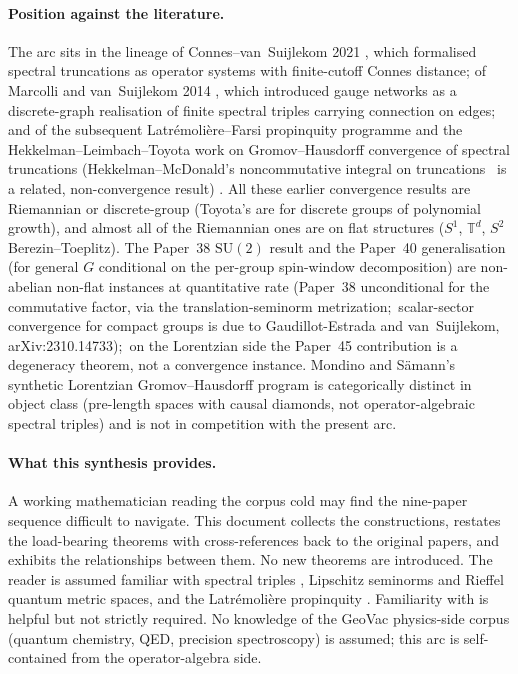 \documentclass[11pt,a4paper]{article}
\theoremstyle{plain}
\theoremstyle{definition}
\newcommand{\T}{\mathbb{T}}
\newcommand{\SU}{\mathrm{SU}}
\newcommand{\gvc}[2]{#2}
\begin{document}
\paragraph{Position against the literature.}
The arc sits in the lineage of Connes--van~Suijlekom 2021
\cite{connes_vs2021}, which formalised spectral truncations as
operator systems with finite-cutoff Connes distance; of Marcolli and
van~Suijlekom 2014 \cite{marcolli_vs2014}, which introduced
gauge networks as a discrete-graph realisation of finite spectral
triples carrying connection on edges; and of the subsequent
Latr\'emoli\`ere--Farsi propinquity programme and the
Hekkelman--Leimbach--Toyota work on Gromov--Hausdorff convergence of
spectral truncations
(Hekkelman--McDonald's noncommutative integral on
truncations~\cite{hekkelman_mcdonald2024b} is a related,
non-convergence result)
\cite{latremoliere_metric_st_2017,
hekkelman2022,
toyota2023,
farsi_latremoliere2024,farsi_latremoliere2025,
leimbach_vs2024}.  All these earlier convergence results
are Riemannian or discrete-group (Toyota's are for discrete groups of
polynomial growth), and almost all of the Riemannian ones are on flat
structures ($S^{1}$, $\T^{d}$, $S^{2}$ Berezin--Toeplitz).  The Paper~38
$\SU(2)$ result and \gvc{p40-general-g-conditional}{the Paper~40 generalisation (for general $G$
conditional on the per-group spin-window decomposition)} are non-abelian
non-flat instances at quantitative rate (\gvc{wh1-p38-gh-convergence}{Paper~38 unconditional for the commutative factor, via the translation-seminorm metrization};\ scalar-sector
convergence for compact groups is due to Gaudillot-Estrada and
van~Suijlekom, arXiv:2310.14733);\ on the Lorentzian side the
Paper~45 contribution is a degeneracy theorem, not a convergence
instance.  Mondino and S\"amann's
synthetic Lorentzian Gromov--Hausdorff program
\cite{minguzzi_suhr2024,mondino_samann2025} is categorically
distinct in object class (pre-length spaces with causal diamonds,
not operator-algebraic spectral triples) and is not in competition
with the present arc.

\paragraph{What this synthesis provides.}
A working mathematician reading the corpus cold may find the
nine-paper sequence difficult to navigate.  This document collects
the constructions, restates the load-bearing theorems with
cross-references back to the original papers, and exhibits the
relationships between them.  No new theorems are introduced.  The
reader is assumed familiar with spectral triples
\cite{connes1995,chamseddine_connes2010}, Lipschitz seminorms and
Rieffel quantum metric spaces, and the Latr\'emoli\`ere propinquity
\cite{latremoliere_metric_st_2017,latremoliere2018}.
Familiarity with \cite{connes_vs2021} is helpful but not strictly
required.  No knowledge of the GeoVac physics-side corpus
(quantum chemistry, QED, precision spectroscopy) is assumed; this
arc is self-contained from the operator-algebra side.
\end{document}
